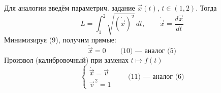 Для аналогии введём параметрич. задание $\vec{x}(t)$, $t\in(1,2)$. Тогда
\begin{equation*}
L=\int_1^2\sqrt{(\dot{\vec{x}})^2}\,dt,\qquad
\dot{\vec{x}}=\frac{d\vec{x}}{dt}
\tag{9}
\end{equation*}
Минимизируя (9), получим прямые:
\begin{equation*}
\ddot{\vec{x}}=0\qquad\text{(10) — аналог (5)}
\tag{10}
\end{equation*}
Произвол (калибровочный) при заменах $t\mapsto f(t)$
\begin{equation*}
\begin{cases}
\dot{\vec{x}}=\vec{v}\\
\vec{v}^{\,2}=1
\end{cases}
\qquad\text{(11) — аналог (6)}
\tag{11}
\end{equation*}


